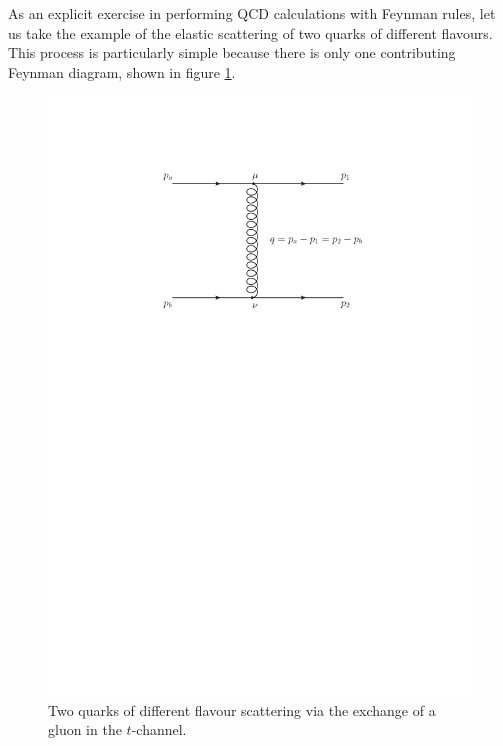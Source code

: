 As an explicit exercise in performing QCD calculations with Feynman rules, let us take the example of the elastic scattering of two quarks of different flavours. This process is particularly simple because there is only one contributing Feynman diagram, shown in figure \ref{fig:qQqQ}.

\begin{figure}[t]
\centering
\includegraphics[scale=0.75]{Images/qQ_t.pdf} 
\caption{Two quarks of different flavour scattering via the exchange of a gluon in the $t$-channel.}
\label{fig:qQqQ}
\end{figure}

